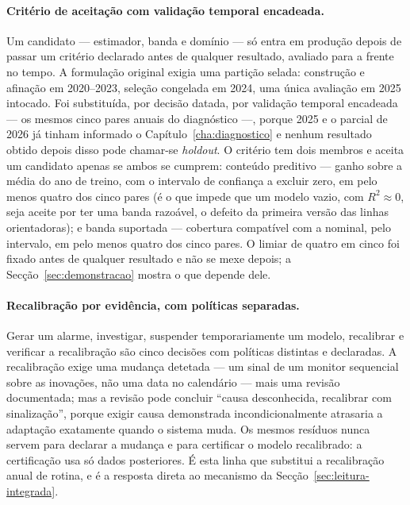 \paragraph{Critério de aceitação com validação temporal encadeada.} Um
candidato --- estimador, banda e domínio --- só entra em produção depois de
passar um critério declarado antes de qualquer resultado, avaliado para a
frente no tempo. A formulação original exigia uma partição selada: construção
e afinação em 2020--2023, seleção congelada em 2024, uma única avaliação em
2025 intocado. Foi substituída, por decisão datada, por validação temporal
encadeada --- os mesmos cinco pares anuais do diagnóstico ---, porque 2025 e
o parcial de 2026 já tinham informado o Capítulo~\ref{cha:diagnostico} e
nenhum resultado obtido depois disso pode chamar-se \emph{holdout}. O critério
tem dois membros e aceita um candidato apenas se ambos se cumprem: conteúdo
preditivo --- ganho sobre a média do ano de treino, com o intervalo de
confiança a excluir zero, em pelo menos quatro dos cinco pares (é o que
impede que um modelo vazio, com $R^2 \approx 0$, seja aceite por ter uma
banda razoável, o defeito da primeira versão das linhas orientadoras); e
banda suportada --- cobertura compatível com a nominal, pelo intervalo, em
pelo menos quatro dos cinco pares. O limiar de quatro em cinco foi fixado
antes de qualquer resultado e não se mexe depois; a
Secção~\ref{sec:demonstracao} mostra o que depende dele.

\paragraph{Recalibração por evidência, com políticas separadas.} Gerar um
alarme, investigar, suspender temporariamente um modelo, recalibrar e
verificar a recalibração são cinco decisões com políticas distintas e
declaradas. A recalibração exige uma mudança detetada --- um sinal de um
monitor sequencial~\cite{Page1954,Lai1995} sobre as inovações, não uma data
no calendário --- mais
uma revisão documentada; mas a revisão pode concluir ``causa desconhecida,
recalibrar com sinalização'', porque exigir causa demonstrada
incondicionalmente atrasaria a adaptação exatamente quando o sistema muda.
Os mesmos resíduos nunca servem para declarar a mudança e para certificar o
modelo recalibrado: a certificação usa só dados posteriores. É esta linha
que substitui a recalibração anual de rotina, e é a resposta direta ao
mecanismo da Secção~\ref{sec:leitura-integrada}.

